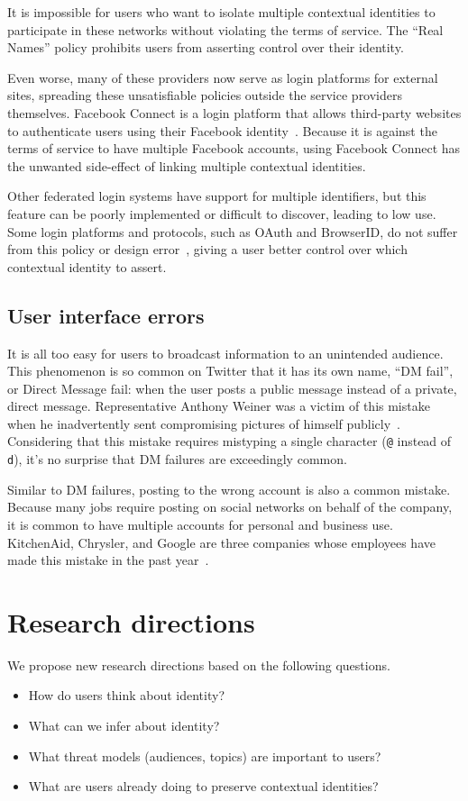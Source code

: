 \documentclass[10pt, conference, compsocconf]{IEEEtran}
\begin{document}
It is impossible for users who want to isolate multiple contextual identities
to participate in these networks without violating the terms of service.  The
``Real Names'' policy prohibits users from asserting control over their
identity.

Even worse, many of these providers now serve as login platforms for external
sites, spreading these unsatisfiable policies outside the service providers
themselves.  Facebook Connect is a login platform that allows third-party
websites to authenticate users using their Facebook identity~\cite{fb_connect}.
Because it is against the terms of service to have multiple Facebook accounts,
using Facebook Connect has the unwanted side-effect of linking multiple
contextual identities.

Other federated login systems have support for multiple identifiers, but this
feature can be poorly implemented or difficult to discover, leading to low use.
Some login platforms and protocols, such as OAuth and BrowserID, do not suffer
from this policy or design error~\cite{browserid,oauth}, giving a user better
control over which contextual identity to assert.

\subsection{User interface errors}
It is all too easy for users to broadcast information to
an unintended audience. This phenomenon is so common on Twitter that it has its
own name, ``DM fail'', or Direct Message fail: when the user posts a public
message instead of a private, direct message. Representative Anthony Weiner was
a victim of this mistake when he inadvertently sent compromising pictures of
himself publicly~\cite{weiner}. Considering that this mistake requires
mistyping a single character (\texttt{@} instead of \texttt{d}), it's no
surprise that DM failures are exceedingly common.

Similar to DM failures, posting to the wrong account is also a common mistake.
Because many jobs require posting on social networks on behalf of the company,
it is common to have multiple accounts for personal and business use.
KitchenAid, Chrysler, and Google are three companies whose employees have
made this mistake in the past year~\cite{kitchenaid,chrysler,yegge}.

\section{Research directions}
We propose new research directions based on the following questions.
\begin{itemize}
\item How do users think about identity?
\item What can we infer about identity?
\item What threat models (audiences, topics) are important to users?
\item What are users already doing to preserve contextual identities?
\end{itemize}
\end{document}
